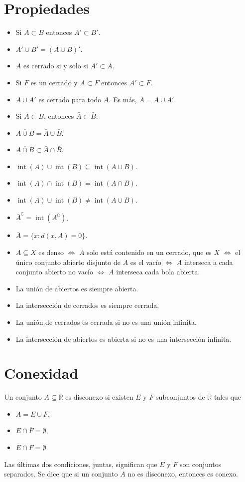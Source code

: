 \documentclass{article}
\DeclareMathOperator{\interior}{int}
\begin{document}
\section*{Propiedades}
\begin{itemize}
\item Si $A\subset B$ entonces $A'\subset B'$.
\item $A'\cup B'=(A\cup B)'$.
\item $A$ es cerrado si y solo si $A'\subset A$.
\item Si $F$ es un cerrado y $A\subset F$ entonces $A'\subset F$.
\item $A\cup A'$ es cerrado para todo $A$. Es más, $\bar{A}=A\cup A'$.
\item Si $A\subset B$, entonces $\bar{A}\subset\bar{B}$.
\item $\overline{A\cup B}=\bar{A}\cup\bar{B}$.
\item $\overline{A\cap B}\subset\bar{A}\cap\bar{B}$.
\item $\interior(A)\cup\interior(B)\subseteq \interior(A\cup B)$.
\item $\interior(A)\cap\interior(B)= \interior(A\cap B)$.
\item $\interior(A)\cup\interior(B)\neq \interior(A\cup B)$.
\item $\bar{A}^\complement=\interior(A^\complement)$.
\item $\bar{A}=\{x: d(x,A)=0\}$.
\item $A\subseteq X$ es denso $\iff$ $A$ solo está contenido en un cerrado, que es $X$ $\iff$ el único conjunto abierto disjunto de $A$ es el vacío $\iff$ $A$ interseca a cada conjunto abierto no vacío $\iff$ $A$ interseca cada bola abierta.
\item La unión de abiertos es siempre abierta.
\item La intersección de cerrados es siempre cerrada.
\item La unión de cerrados es cerrada si no es una unión infinita.
\item La intersección de abiertos es abierta si no es una intersección infinita.
\end{itemize}

\section*{Conexidad}

Un conjunto $A\subseteq \mathbb{R}$ es disconexo si existen $E$ y $F$ subconjuntos de $\mathbb{R}$ tales que
\begin{itemize}
\item $A=E\cup F$,
\item $E\cap \overline{F}=\emptyset$,
\item $\overline{E}\cap F=\emptyset$.
\end{itemize}
Las últimas dos condiciones, juntas, significan que $E$ y $F$ son conjuntos separados. Se dice que si un conjunto $A$ no es disconexo, entonces es conexo.
\end{document}
